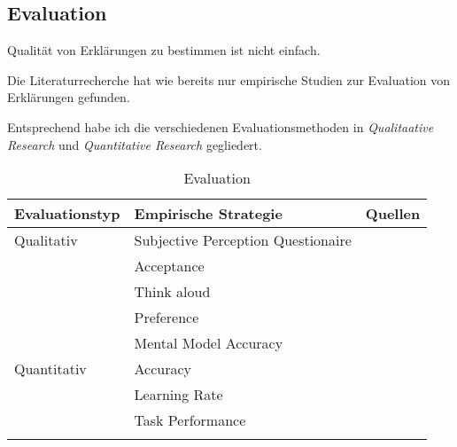 \subsection{Evaluation}

Qualität von Erklärungen zu bestimmen ist nicht einfach.

Die Literaturrecherche hat wie bereits \cite{nunes_systematic_2017} nur empirische Studien zur Evaluation von Erklärungen gefunden.

Entsprechend \cite{wohlin2012experimentation} habe ich die verschiedenen Evaluationsmethoden in \textit{Qualitaative Research} und \textit{Quantitative Research} gegliedert.

\begin{longtable}{|p{}|p{}|p{}|}
    \hline
    \textbf{Evaluationstyp} & \textbf{Empirische Strategie} & \textbf{Quellen} \\ \hline
    Qualitativ              & Subjective Perception Questionaire &  \cite{balog_measuring_2020} \cite{sato_context_nodate} \cite{waa_evaluating_2021} \cite{eiband_impact_2019}  \cite{kouki_user_2017} \cite{tsai_evaluating_2019} \cite{hernandez-bocanegra_effects_2020} \cite{zahedi_towards_2019} \cite{tsai_effects_2020} \cite{ribera2019can} \\
                            & Acceptance & \cite{tintarev_designing_nodate} \cite{hernandez-bocanegra_effects_2020} \cite{kunkel_let_2019} \\
                            & Think aloud & \cite{wiegand_id_2020} \cite{yamada_evaluating_2016} \\
                            & Preference & \cite{kouki_user_2017} \cite{mucha_interfaces_2021} \cite{abdulrahman_belief-based_2019} \cite{waa_evaluating_2021} \cite{wiegand_id_2020} \cite{stange_effects_2021} \cite{kaptein_personalised_2017} \\
                            & Mental Model Accuracy & \cite{gunning2019darpa} \\
    \hline
    Quantitativ             & Accuracy & \cite{tintarev_designing_nodate} \cite{waa_evaluating_2021} \cite{mucha_interfaces_2021}  \cite{kunkel_let_2019} \cite{zolotas_towards_2019} \\
                            & Learning Rate & \cite{tintarev_designing_nodate} \cite{gunning2019darpa} \\
                            & Task Performance & \cite{waa_evaluating_2021}  \cite{mucha_interfaces_2021}  \cite{abdulrahman_belief-based_2019} \cite{zolotas_towards_2019} \cite{martin_developing_2019} \cite{martin_evaluating_2021} \cite{gunning2019darpa} \\
    \hline
\caption{Evaluation}
\label{tab:evaluation_of_explanations}
\end{longtable}

